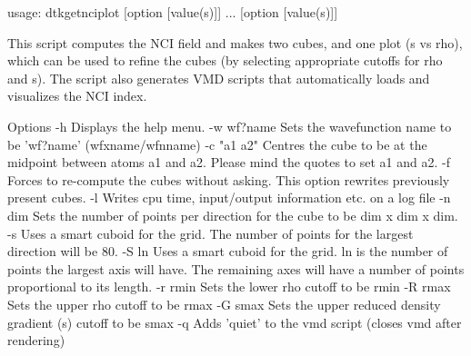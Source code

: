 
    usage: dtkgetnciplot [option [value(s)]] ... [option [value(s)]]

This script computes the NCI field and makes two cubes, and one plot
(s vs rho), which can be used to refine the cubes (by selecting
appropriate cutoffs for rho and s). The script also generates
VMD scripts that automatically loads and visualizes the 
NCI index.

Options 
  -h           Displays the help menu.
  -w wf?name   Sets the wavefunction name to be 'wf?name' (wfxname/wfnname)
  -c "a1 a2"     Centres the cube to be at the midpoint between atoms a1 and
                 a2. Please mind the quotes to set a1 and a2.
  -f           Forces to re-compute the cubes without asking. This option
                 rewrites previously present cubes.
  -l        	Writes cpu time, input/output information etc. on a log file
  -n  dim   	Sets the number of points per direction for the cube
            	  to be dim x dim x dim.
  -s        	Uses a smart cuboid for the grid. The number of points for the
            	  largest direction will be 80.
  -S ln     	Uses a smart cuboid for the grid. ln is the number of points
            	  the largest axis will have. The remaining axes will have
            	  a number of points proportional to its length.
  -r rmin      Sets the lower rho cutoff to be rmin
  -R rmax      Sets the upper rho cutoff to be rmax
  -G smax      Sets the upper reduced density gradient (s) cutoff to be smax
  -q           Adds 'quiet' to the vmd script (closes vmd after rendering)


